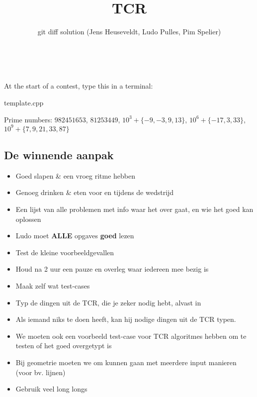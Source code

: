 \documentclass{article}
\title{TCR}
\author{git diff solution (Jens Heuseveldt, Ludo Pulles, Pim Spelier)}
\begin{document}
\maketitle
\begin{center}
	\makeatletter
	\textbf{\@title} \\
	\emph{\@author}
	\makeatother
\end{center}

\tableofcontents

\begin{center}
At the start of a contest, type this in a terminal:
\end{center}



\begin{center}
template.cpp
\end{center}



Prime numbers: $\mathit{982451653}$, $\mathit{81253449}$, $10^3 + \{-9,-3,9,13\}$, $10^6 + \{-17, 3, 33\}$, $10^9 + \{7,9,21,33,87\}$

\subsection{De winnende aanpak}

\begin{itemize}
	\setlength\itemsep{-.25em}
	\item Goed slapen \& een vroeg ritme hebben
	\item Genoeg drinken \& eten voor en tijdens de wedstrijd
	\item Een lijst van alle problemen met info waar het over gaat, en wie het goed kan oplossen
	\item Ludo moet {\huge\textbf{ALLE}} opgaves \textbf{goed} lezen
	\item Test de kleine voorbeeldgevallen
	\item Houd na 2 uur een pauze en overleg waar iedereen mee bezig is
	\item Maak zelf wat test-cases
	\item Typ de dingen uit de TCR, die je zeker nodig hebt, alvast in
	\item Als iemand niks te doen heeft, kan hij nodige dingen uit de TCR typen.
	\item We moeten ook een voorbeeld test-case voor TCR algoritmes hebben om te testen of het goed overgetypt is
	\item Bij geometrie moeten we om kunnen gaan met meerdere input manieren (voor bv. lijnen)
	\item Gebruik veel long long\textquotesingle s
\end{itemize}
\end{document}
